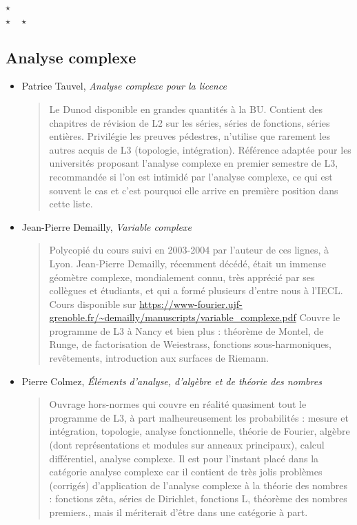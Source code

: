 \documentclass{article}
\def\separateur{\begin{center}
$\star$\\
$\star\quad\star$
\end{center}}
\begin{document}
\separateur
\subsection{Analyse complexe}

\begin{mdframed}
\begin{itemize}
\item Patrice Tauvel, \emph{Analyse complexe pour la licence}
\begin{quote}
Le \og Dunod\fg{} disponible en grandes quantités à la BU. Contient des chapitres de révision de L2 sur les séries, séries de fonctions, séries entières. Privilégie les preuves pédestres, n'utilise que rarement les autres acquis de L3 (topologie, intégration).  Référence adaptée pour les universités proposant l'analyse complexe en premier semestre de L3, recommandée si l'on est intimidé par l'analyse complexe, ce qui est souvent le cas et c'est pourquoi elle arrive en première position dans cette liste.
\end{quote}
\end{itemize}
\end{mdframed}
\begin{itemize}
\item Jean-Pierre Demailly, \emph{Variable complexe}
\begin{quote}
Polycopié du cours suivi en 2003-2004 par l'auteur de ces lignes, à Lyon.
Jean-Pierre Demailly, récemment décédé, était un immense géomètre complexe, mondialement connu, très apprécié par ses collègues et étudiants, et qui a formé plusieurs d'entre nous à l'IECL. Cours disponible sur \url{https://www-fourier.ujf-grenoble.fr/~demailly/manuscripts/variable_complexe.pdf} Couvre le programme de L3 à Nancy et bien plus : théorème de Montel, de Runge, de factorisation de Weiestrass, fonctions sous-harmoniques, revêtements, introduction aux surfaces de Riemann.
\end{quote}
\item Pierre Colmez, \emph{Éléments d'analyse, d'algèbre et de théorie des nombres}
\begin{quote}
Ouvrage hors-normes qui couvre en réalité quasiment tout le programme de L3, à part malheureusement les probabilités : mesure et intégration, topologie, analyse fonctionnelle, théorie de Fourier, algèbre (dont représentations et modules sur anneaux principaux), calcul différentiel, analyse complexe. Il est pour l'instant placé dans la catégorie analyse complexe car il contient de très jolis problèmes (corrigés) d'application de l'analyse complexe à la théorie des nombres : fonctions zêta, séries de Dirichlet, fonctions L, théorème des nombres premiers., mais il mériterait d'être dans une catégorie à part.
\end{quote}
\end{itemize}
\end{document}
